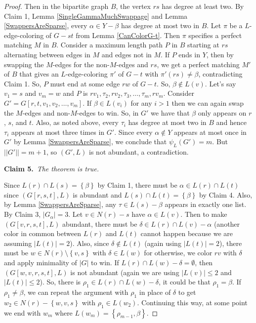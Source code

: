 \documentclass[12pt]{article}
\theoremstyle{plain}
\theoremstyle{definition}
\theoremstyle{remark}
\newcommand{\set}[1]{\left\{ #1 \right\}}
\newcommand{\claim}[2]{{\bf Claim #1.}~{\it #2}~~}
\begin{document}
\begin{proof}
			Then in the bipartite graph $B$, the vertex $rs$ has degree at least two.  By Claim 1, Lemma \ref{SingleGammaMuchSwappage} and Lemma \ref{SwappersAreSparse}, every $\alpha \in Y - \beta$ has degree at most two in $B$.  Let $\pi$ be a $L$-edge-coloring of $G-st$ from Lemma \ref{CanColorG-t}.  Then $\pi$ specifies a perfect matching $M$ in $B$.  Consider a maximum length path $P$ in $B$ starting at $rs$ alternating between edges in $M$ and edges not in $M$.  
			If $P$ ends in $Y$, then by swapping the $M$-edges for the non-$M$-edges and $rs$, we get a perfect matching $M'$ of $B$ that gives an $L$-edge-coloring $\pi'$ of $G-t$ with $\pi'(rs) \ne \beta$, contradicting Claim 1.  So, $P$ must end at some edge $rw$ of $G - t$.   So, $\beta \not \in L(v)$.  Let's say $v_1 = s$ and $v_m = w$ and $P$ is $rv_1,\tau_2, rv_2, \tau_3, \ldots, \tau_m, rv_m$.  Consider $G' = G[r,t,v_1, v_2, \ldots, v_m]$.  If $\beta \in L(v_i)$ for any $i > 1$ then we can again swap the $M$-edges and non-$M$-edges to win.   So, in $G'$ we have that $\beta$ only appears on $r$, $s$, and $t$.  Also, as noted above, every $\tau_i$ has degree at most two in $B$ and hence $\tau_i$ appears at most three times in $G'$.  Since every $\alpha \not \in Y$ appears at most once in $G'$ by Lemma \ref{SwappersAreSparse}, we conclude that $\psi_L(G') = m$.  But $||G'|| = m + 1$, so $(G', L)$ is not abundant, a contradiction.

		\claim{5}{The theorem is true.}
		
			 Since $L(r) \cap L(s) = \set{\beta}$ by Claim 1, there must be $\alpha \in L(r) \cap L(t)$ since $(G[r,s,t],L)$ is abundant and $L(s) \cap L(t) = \set{\beta}$ by Claim 4.  Also, by Lemma \ref{SwappersAreSparse}, any $\tau \in L(s) - \beta$ appears in exactly one list.  By Claim 3, $|G_\alpha| = 3$.  Let $v \in N(r) - s$ have $\alpha \in L(v)$.  Then to make $(G[v,r,s,t], L)$ abundant, there must be $\delta \in L(r) \cap L(v) - \alpha$ (another color in common between $L(r)$ and $L(t)$ cannot happen because we are assuming $|L(t)| = 2$).  Also, since $\delta \not \in L(t)$ (again using $|L(t)| = 2$), there must be $w \in N(r) \setminus \set{v,s}$ with $\delta \in L(w)$ for otherwise, we color $rv$ with $\delta$ and apply minimality of $|G|$ to win. If $L(r) \cap L(w) - \delta = \emptyset$, then $(G[w,v,r,s,t], L)$ is not abundant (again we are using $|L(v)| \le 2$ and $|L(t)| \le 2$).  So, there is $\rho_1 \in L(r) \cap L(w) - \delta$, it could be that $\rho_1 = \beta$.  If $\rho_1 \ne \beta$, we can repeat the argument with $\rho_1$ in place of $\delta$ to get $w_2 \in N(r) - \set{w, v,s}$ with $\rho_1 \in L(w_2)$.  Continuing this way, at some point we end with $w_m$ where $L(w_m) = \set{\rho_{m-1}, \beta}$.


\end{proof}
\end{document}
